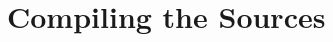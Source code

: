 \documentclass[11pt]{nmemo}
\newcommand{\comp}[1]{\normalfont\footnotesize\texttt{#1}\normalsize}
\newcommand{\draco}{{\normalfont\sffamily Draco}}
\newcommand{\metis}{{\normalfont\sffamily Metis}}
\newcommand{\cmake}{{\normalfont\bfseries CMake}}
\begin{document}





\section{Compiling the Sources}
\label{compile}


\end{document}
